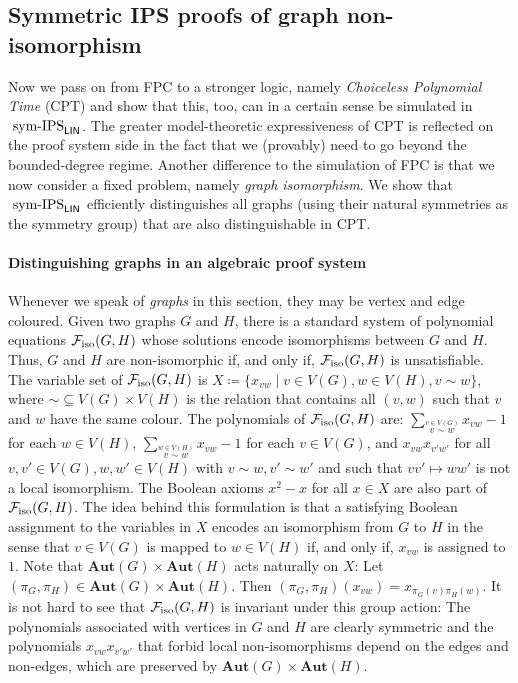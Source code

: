 \documentclass[10pt,a4paper]{article}
\newcommand{\Aut}{\mathbf{Aut}}
\newcommand{\Ff}{{\cal F}}
\newcommand{\Piso}{\Ff_{\text{iso}}}
\newcommand{\symIPSlin}{\text{ \upshape sym-IPS}_{\mathsf{LIN}}}
\begin{document}
\subsection{Symmetric IPS proofs of graph non-isomorphism}
Now we pass on from FPC to a stronger logic, namely \emph{Choiceless Polynomial Time} (CPT) and show that this, too, can in a certain sense be simulated in$\symIPSlin{}$. The greater model-theoretic expressiveness of CPT is reflected on the proof system side in the fact that we (provably) need to go beyond the bounded-degree regime. 
Another difference to the simulation of FPC is that we now consider a fixed problem, namely
\emph{graph isomorphism}. We show that$\symIPSlin{}$ efficiently distinguishes all graphs (using their natural symmetries as the symmetry group) that are also distinguishable in CPT. %

\paragraph*{Distinguishing graphs in an algebraic proof system} 
Whenever we speak of \emph{graphs} in this section, they may be vertex and edge coloured. 
Given two graphs $G$ and $H$, there is a standard system of polynomial equations $\Piso(G,H)$ \cite{GI, Pago} whose solutions encode isomorphisms between $G$ and $H$. Thus, $G$ and $H$ are non-isomorphic if, and only if, $\Piso(G,H)$ is unsatisfiable.
The variable set of $\Piso(G,H)$ is $X \coloneqq \{x_{vw} \mid v \in V(G), w \in V(H), v \sim w\}$, where $\sim \subseteq V(G) \times V(H)$ is the relation that contains all $(v,w)$ such that $v$ and $w$ have the same colour.
The polynomials of $\Piso(G,H)$ are: $\sum_{\stackrel{v \in V(G)}{v \sim w}} x_{vw} - 1$ for each $w \in V(H)$, $\sum_{\stackrel{w \in V(H)}{v \sim w}} x_{vw} - 1 $ for each $v \in V(G)$, and $x_{vw}x_{v'w'}$ for all $v,v' \in V(G), w,w' \in V(H)$ with $v \sim w, v' \sim w'$ and such that $vv' \mapsto ww'$ is not a local isomorphism.
The Boolean axioms $x^2 - x$ for all $x \in X$ are also part of $\Piso(G,H)$. The idea behind this formulation is that a satisfying Boolean assignment to the variables in $X$ encodes an isomorphism from $G$ to $H$ in the sense that $v \in V(G)$ is mapped to $w \in V(H)$ if, and only if, $x_{vw}$ is assigned to $1$.
Note that $\Aut(G) \times \Aut(H)$ acts naturally on $X$: Let $(\pi_G, \pi_H) \in \Aut(G) \times \Aut(H)$. Then $(\pi_G, \pi_H)(x_{vw}) = x_{\pi_G(v)\pi_H(w)}$. It is not hard to see that $\Piso(G,H)$ is invariant under this group action: The polynomials associated with vertices in $G$ and $H$ are clearly symmetric and the polynomials $x_{vw}x_{v'w'}$ that forbid local non-isomorphisms depend on the edges and non-edges, which are preserved by $\Aut(G) \times \Aut(H)$.
\end{document}
